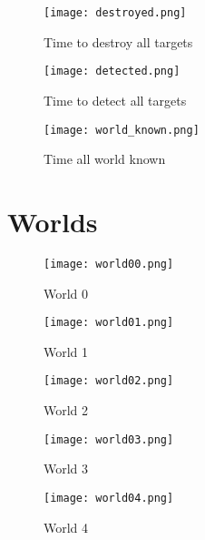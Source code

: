 \begin{figure}[H]
	\centering
	\texttt{[image: destroyed.png]}
	\caption{Time to destroy all targets}
	\label{fig:time_to_destroy}
\end{figure}

\begin{figure}[H]
	\centering
	\texttt{[image: detected.png]}
	\caption{Time to detect all targets}
	\label{fig:time_to_detect}
\end{figure}

\begin{figure}[H]
	\centering
	\texttt{[image: world\_known.png]}
	\caption{Time all world known}
	\label{fig:time_all_world_known}
\end{figure}


\section{Worlds}
\label{sec:world_images}
\begin{figure}[H]
	\centering
	\texttt{[image: world00.png]}
	\caption{World 0}
	\label{fig:world0}
\end{figure}

\begin{figure}[H]
	\centering
	\texttt{[image: world01.png]}
	\caption{World 1}
	\label{fig:world1}
\end{figure}

\begin{figure}[H]
	\centering
	\texttt{[image: world02.png]}
	\caption{World 2}
	\label{fig:world2}
\end{figure}

\begin{figure}[H]
	\centering
	\texttt{[image: world03.png]}
	\caption{World 3}
	\label{fig:world3}
\end{figure}

\begin{figure}[H]
	\centering
	\texttt{[image: world04.png]}
	\caption{World 4}
	\label{fig:world4}
\end{figure}

